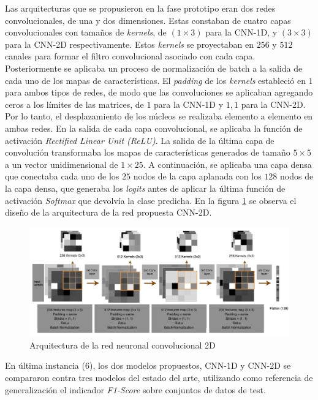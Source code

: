 Las arquitecturas que se propusieron en la fase prototipo eran dos redes convolucionales, de una y dos dimensiones. Estas constaban de cuatro capas convolucionales con tamaños de \textit{kernels}, de $(1 \times 3)$ para la CNN-1D, y $(3 \times 3)$ para la CNN-2D respectivamente. Estos \textit{kernels} se proyectaban en $256$ y $512$ canales para formar el filtro convolucional asociado con cada capa. Posteriormente se aplicaba un proceso de normalización de batch a la salida de cada uno de los mapas de características. El \textit{padding} de los \textit{kernels} estableció en $1$ para ambos tipos de redes, de modo que las convoluciones se aplicaban agregando ceros a los límites de las matrices, de $1$ para la CNN-1D y ${1, 1}$ para la CNN-2D. Por lo tanto, el desplazamiento de los núcleos se realizaba elemento a elemento en ambas redes. En la salida de cada capa convolucional, se aplicaba la función de activación \textit{Rectified Linear Unit (ReLU)}. La salida de la última capa de convolución transformaba los mapas de características generados de tamaño $5 \times 5$ a un vector unidimensional de $1 \times 25$. A continuación, se aplicaba una capa densa que conectaba cada uno de los $25$ nodos de la capa aplanada con los $128$ nodos de la capa densa, que generaba los \textit{logits} antes de aplicar la última función de activación \textit{Softmax} que devolvía la clase predicha. En la figura \ref{TASPCNNIMAGE} se observa el diseño de la arquitectura de la red propuesta CNN-2D.

\begin{figure}[H]
	\centering
	\includegraphics[width=15cm]{Figures/1stPaper/TASPCNN.png}
	\caption{Arquitectura de la red neuronal convolucional 2D}
	\label{TASPCNNIMAGE}
\end{figure}

En última instancia (6), los dos modelos propuestos, CNN-1D y CNN-2D se compararon contra tres modelos del estado del arte, utilizando como referencia de generalización el indicador \textit{F1-Score} sobre conjuntos de datos de test.



